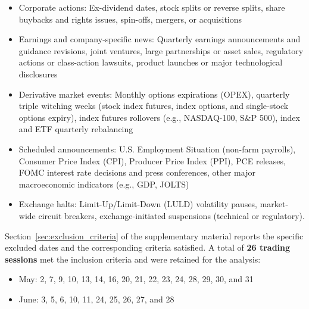 \documentclass[10pt,a4paper,oneside]{article}
\begin{document}
\begin{itemize}
    \item Corporate actions: Ex-dividend dates, stock splits or reverse splits, share buybacks and rights issues, spin-offs, mergers, or acquisitions
    \item Earnings and company-specific news: Quarterly earnings announcements and guidance revisions, joint ventures, large partnerships or asset sales, regulatory actions or class-action lawsuits, product launches or major technological disclosures
    \item Derivative market events: Monthly options expirations (OPEX), quarterly triple witching weeks (stock index futures, index options, and single-stock options expiry), index futures rollovers (e.g., NASDAQ-100, S\&P 500), index and ETF quarterly rebalancing
    \item Scheduled announcements: U.S. Employment Situation (non-farm payrolls), Consumer Price Index (CPI), Producer Price Index (PPI), PCE releases, FOMC interest rate decisions and press conferences, other major macroeconomic indicators (e.g., GDP, JOLTS)
    \item Exchange halts: Limit-Up/Limit-Down (LULD) volatility pauses, market-wide circuit breakers, exchange-initiated suspensions (technical or regulatory).
\end{itemize}

Section~\ref{sec:exclusion_criteria} of the supplementary material reports the specific excluded dates and the corresponding criteria satisfied. A total of \textbf{26 trading sessions} met the inclusion criteria and were retained for the analysis:

\begin{itemize}
    \item May: 2, 7, 9, 10, 13, 14, 16, 20, 21, 22, 23, 24, 28, 29, 30, and 31
    \item June: 3, 5, 6, 10, 11, 24, 25, 26, 27, and 28
\end{itemize}



\end{document}
